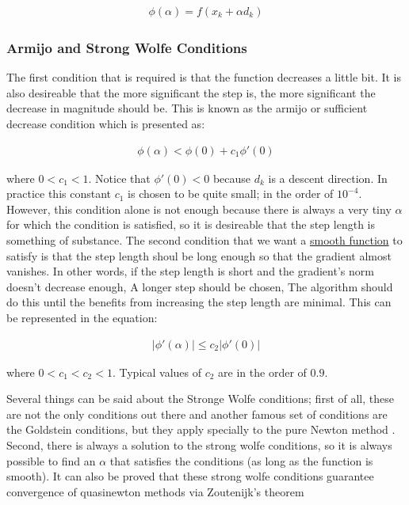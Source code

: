 \begin{equation}
  \begin{aligned}
    \phi(\alpha) = f(x_k + \alpha d_k)
  \end{aligned}
\end{equation}

\subsubsection{Armijo and Strong Wolfe Conditions}

The first condition that is required is that the function decreases a little bit.  It is also desireable that the more significant the step is, the more significant the decrease in magnitude should be.  This is known as the armijo or sufficient decrease condition which is presented as:

\begin{equation} \label{armijo}
  \begin{aligned}
    \phi (\alpha) < \phi(0) + c_1 \phi'(0)
  \end{aligned}
\end{equation}

where $0  < c_1 < 1$.  Notice that $\phi'(0) < 0$ because $d_k$ is a descent direction.  In practice this constant $c_1$ is chosen to be quite small;  in the order of $10^{-4}$.  However, this condition alone is not enough because there is always a very tiny $\alpha$ for which the condition is satisfied,  so it is desireable that the step length is something of substance.  The second condition that we want a \underline{smooth function} to satisfy is that the step length shoul be long enough so that the gradient almost vanishes.  In other words, if the step length is short and the gradient's norm doesn't decrease enough, A longer step should be chosen,  The algorithm should do this until the benefits from increasing the step length are minimal.  This can be represented in the equation:

\begin{equation} \label{strongWolfe}
  \begin{aligned}
    |\phi'(\alpha)| \leq c_2|\phi'(0)| 
  \end{aligned}
\end{equation}

where $0 < c_1 < c_2 < 1$.  Typical values of $c_2$ are in the order of $0.9$.

Several things can be said about the Stronge Wolfe conditions; first of all, these are not the only conditions out there and another famous set of conditions are the Goldstein conditions, but they apply specially to the pure Newton method \citep{nocedal}.  Second, there is always a solution to the strong wolfe conditions, so it is always possible to find an $\alpha$ that satisfies the conditions (as long as the function is smooth).  It can also be proved that these strong wolfe conditions guarantee convergence of quasinewton methods via Zoutenijk's theorem \citep{zoutendijk}

